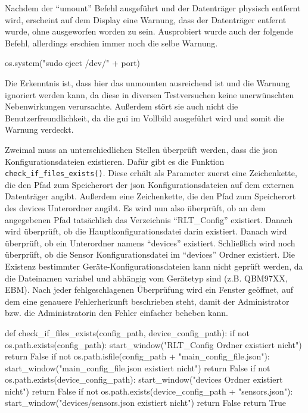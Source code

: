 Nachdem der \enquote{umount} Befehl ausgeführt und der Datenträger physisch entfernt wird, erscheint auf dem Display eine Warnung, dass der Datenträger entfernt wurde, ohne ausgeworfen worden zu sein. Ausprobiert wurde auch der folgende Befehl, allerdings erschien immer noch die selbe Warnung. \cite[vgl.][]{Totor:2022}
\begin{pythoncode}
	os.system("sudo eject /dev/" + port)
\end{pythoncode}
Die Erkenntnis ist, dass hier das unmounten ausreichend ist und die Warnung ignoriert werden kann, da diese in diversen Testversuchen keine unerwünschten Nebenwirkungen verursachte. Außerdem stört sie auch nicht die Benutzerfreundlichkeit, da die \acs{gui} im Vollbild ausgeführt wird und somit die Warnung verdeckt.

Zweimal muss an unterschiedlichen Stellen überprüft werden, dass die \acs{json} Konfigurationsdateien existieren. Dafür gibt es die Funktion \lstinline{check_if_files_exists()}. Diese erhält als Parameter zuerst eine Zeichenkette, die den Pfad zum Speicherort der \acs{json} Konfigurationsdateien auf dem externen Datenträger angibt. Außerdem eine Zeichenkette, die den Pfad zum Speicherort des devices Unterordner angibt. Es wird nun also überprüft, ob an dem angegebenen Pfad tatsächlich das Verzeichnis \enquote{RLT\_Config} existiert. Danach wird überprüft, ob die Hauptkonfigurationsdatei darin existiert. Danach wird überprüft, ob ein Unterordner namens \enquote{devices} existiert. Schließlich wird noch überprüft, ob die Sensor Konfigurationsdatei im \enquote{devices} Ordner existiert. Die Existenz bestimmter Geräte-Konfigurationsdateien kann nicht geprüft werden, da die Dateinamen variabel und abhängig vom Gerätetyp sind (z.B. QBM97XX, EBM). Nach jeder fehlgeschlagenen Überprüfung wird ein Fenster geöffnet, auf dem eine genauere Fehlerherkunft beschrieben steht, damit der Administrator bzw. die Administratorin den Fehler einfacher beheben kann.
\begin{pythoncode}
def check_if_files_exists(config_path, device_config_path):
	if not os.path.exists(config_path):
		start_window("RLT_Config Ordner existiert nicht")
		return False
	if not os.path.isfile(config_path + "main_config_file.json"):
		start_window("main_config_file.json existiert nicht")
		return False
	if not os.path.exists(device_config_path):
		start_window("devices Ordner existiert nicht")
		return False
	if not os.path.exists(device_config_path + "sensors.json"):
		start_window("devices/sensors.json existiert nicht")
		return False
	return True
\end{pythoncode}